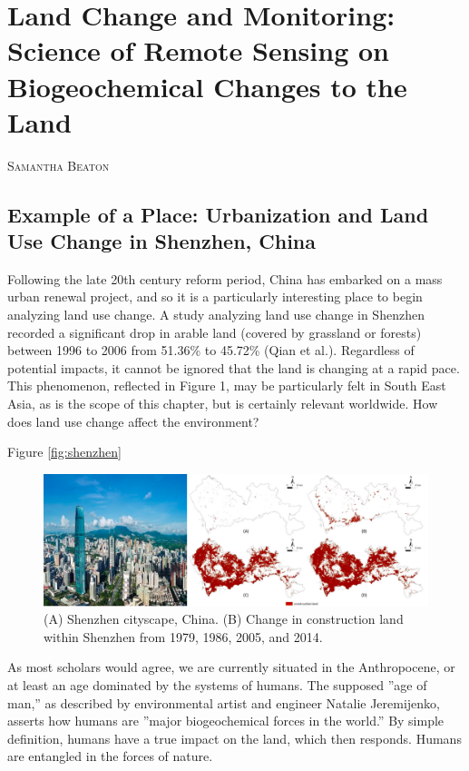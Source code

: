 \documentclass{book}\usepackage{knitr}
\makeatletter
\newcommand{\chapterauthor}[1]{%
  {\parindent0pt\vspace*{-25pt}%
  \linespread{1.1}\large\scshape#1%
  \par\nobreak\vspace*{35pt}}
  \@afterheading%
}
\makeatother
\begin{document}
\chapter[header short chapter name]{Land Change and Monitoring: Science of Remote Sensing on Biogeochemical Changes to the Land}

\chapterauthor{Samantha Beaton}

\section{Example of a Place: Urbanization and Land Use Change in Shenzhen, China}

Following the late 20th century reform period, China has embarked on a mass urban renewal project, and so it is a particularly interesting place to begin analyzing land use change. A study analyzing land use change in Shenzhen recorded a significant drop in arable land (covered by grassland or forests) between 1996 to 2006 from 51.36\% to 45.72\% (Qian et al.). Regardless of potential impacts, it cannot be ignored that the land is changing at a rapid pace. This phenomenon, reflected in Figure 1, may be particularly felt in South East Asia, as is the scope of this chapter, but is certainly relevant worldwide. How does land use change affect the environment?

Figure \ref{fig:shenzhen}

\begin{figure}
\includegraphics[width=\linewidth]{images/land-use/Shenzhen-cityscape.png}
\caption{(A) Shenzhen cityscape, China. (B) Change in construction land within Shenzhen from 1979, 1986, 2005, and 2014.}
\label{figure:shenzen}
\end{figure}

As most scholars would agree, we are currently situated in the Anthropocene, or at least an age dominated by the systems of humans. The supposed ''age of man,'' as described by environmental artist and engineer Natalie Jeremijenko, asserts how humans are ''major biogeochemical forces in the world.'' By simple definition, humans have a true impact on the land, which then responds. Humans are entangled in the forces of nature. 
\end{document}
